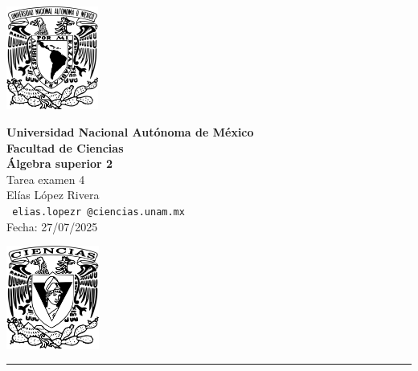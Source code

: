 \documentclass[11pt,letterpaper]{article}
\begin{document}

\begin{center}
    \begin{minipage}{3cm}
    	\begin{center}
    		\includegraphics[height=3.4cm]{logo_unam.png}
    	\end{center}
    \end{minipage}\hfill
    \begin{minipage}{10cm}
    	\begin{center}
    	\textbf{\large Universidad Nacional Autónoma de México}\\[0.1cm]
        \textbf{Facultad de Ciencias}\\[0.1cm]
        \textbf{\'Algebra superior 2}\\[0.1cm]
        Tarea examen 4 \\[0.1cm]
         El\'ias L\'opez Rivera\\[0.1cm]
        \texttt{ elias.lopezr\,@ciencias.unam.mx }\\[0.1cm]
        Fecha:\,\,27/07/2025
    	\end{center}
    \end{minipage}\hfill
    \begin{minipage}{3cm}
    	\begin{center}
    		\includegraphics[height=3.4cm]{logo_FC.png}
    	\end{center}
    \end{minipage}
\end{center}

\rule{17cm}{0.1mm}
\end{document}
